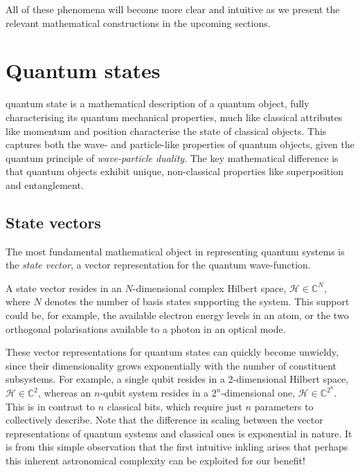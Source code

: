 All of these phenomena will become more clear and intuitive as we present the relevant mathematical constructions in the upcoming sections.

%
%

\section{Quantum states}

 quantum state is a mathematical description of a quantum object, fully characterising its quantum mechanical properties, much like classical attributes like momentum and position characterise the state of classical objects. This captures both the wave- and particle-like properties of quantum objects, given the quantum principle of \textit{wave-particle duality}. The key mathematical difference is that quantum objects exhibit unique, non-classical properties like superposition and entanglement.

%
%

\subsection{State vectors}

The most fundamental mathematical object in representing quantum systems is the \textit{state vector}, a vector representation for the quantum wave-function.

A state vector resides in an $N$-dimensional complex Hilbert space, \mbox{$\mathcal{H}\in\mathbb{C}^N$}, where $N$ denotes the number of basis states supporting the system. This support could be, for example, the available electron energy levels in an atom, or the two orthogonal polarisations available to a photon in an optical mode.

These vector representations for quantum states can quickly become unwieldy, since their dimensionality grows exponentially with the number of constituent subsystems. For example, a single qubit resides in a 2-dimensional Hilbert space, \mbox{$\mathcal{H}\in\mathbb{C}^2$}, whereas an $n$-qubit system resides in a $2^n$-dimensional one, \mbox{$\mathcal{H}\in\mathbb{C}^{2^n}$}. This is in contrast to $n$ classical bits, which require just $n$ parameters to collectively describe. Note that the difference in scaling between the vector representations of quantum systems and classical ones is exponential in nature. It is from this simple observation that the first intuitive inkling arises that perhaps this inherent astronomical complexity can be exploited for our benefit! 

